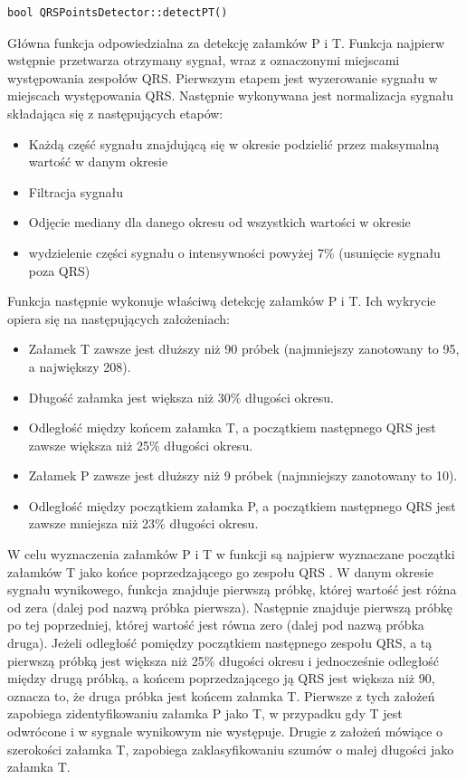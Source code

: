\documentclass[a4paper, 11pt]{article}
\begin{document}
\begin{lstlisting}
bool QRSPointsDetector::detectPT()
\end{lstlisting}

Główna funkcja odpowiedzialna za detekcję załamków P i T. Funkcja najpierw wstępnie przetwarza
otrzymany sygnał, wraz z oznaczonymi miejscami występowania zespołów QRS. Pierwszym etapem jest
wyzerowanie sygnału w miejscach występowania QRS. Następnie wykonywana jest normalizacja sygnału
składająca się z następujących etapów:
\begin{itemize}
     \item Każdą część sygnału znajdującą się w okresie podzielić przez maksymalną wartość w danym okresie
     \item Filtracja sygnału
     \item Odjęcie mediany dla danego okresu od wszystkich wartości w okresie
     \item wydzielenie części sygnału o intensywności powyżej 7\% (usunięcie sygnału poza
QRS)
\end{itemize}

Funkcja następnie wykonuje właściwą detekcję załamków P i T. Ich wykrycie opiera się na następujących
założeniach:
\begin{itemize}
     \item Załamek T zawsze jest dłuższy niż 90 próbek (najmniejszy zanotowany to 95, a
największy 208).
     \item Długość załamka jest większa niż 30\% długości okresu.
     \item Odległość między końcem załamka T, a początkiem następnego QRS jest zawsze
większa niż 25\% długości okresu.
     \item Załamek P zawsze jest dłuższy niż 9 próbek (najmniejszy zanotowany to 10).
     \item Odległość między początkiem załamka P, a początkiem następnego QRS jest
zawsze mniejsza niż 23\% długości okresu.
\end{itemize}

W celu wyznaczenia załamków P i T w funkcji są najpierw wyznaczane początki załamków T jako
końce poprzedzającego go zespołu QRS . W danym okresie sygnału wynikowego, funkcja znajduje
pierwszą próbkę, której wartość jest różna od zera (dalej pod nazwą próbka pierwsza). Następnie
znajduje pierwszą próbkę po tej poprzedniej, której wartość jest równa zero (dalej pod nazwą próbka
druga). Jeżeli odległość pomiędzy początkiem następnego zespołu QRS, a tą pierwszą próbką
jest większa niż 25\% długości okresu i jednocześnie odległość między drugą próbką, a końcem
poprzedzającego ją QRS jest większa niż 90, oznacza to, że druga próbka jest końcem załamka T.
Pierwsze z tych założeń zapobiega zidentyfikowaniu załamka P jako T, w przypadku gdy T jest
odwrócone i w sygnale wynikowym nie występuje. Drugie z założeń mówiące o szerokości załamka
T, zapobiega zaklasyfikowaniu szumów o małej długości jako załamka T.
\end{document}
